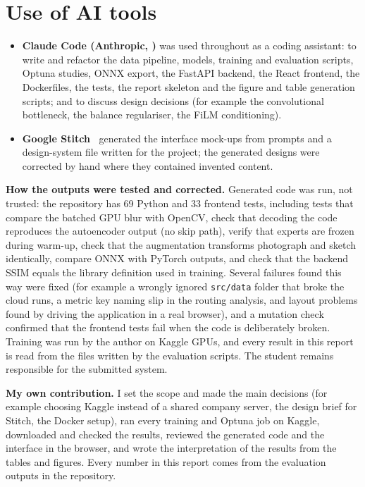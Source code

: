 \documentclass[conference]{IEEEtran}
\begin{document}
\section{Use of AI tools}
\begin{itemize}
\item \textbf{Claude Code (Anthropic, \cite{claudecode})} was used throughout as a coding assistant: to write and refactor the data pipeline, models, training and evaluation scripts, Optuna studies, ONNX export, the FastAPI backend, the React frontend, the Dockerfiles, the tests, the report skeleton and the figure and table generation scripts; and to discuss design decisions (for example the convolutional bottleneck, the balance regulariser, the FiLM conditioning).
\item \textbf{Google Stitch~\cite{stitch}} generated the interface mock-ups from prompts and a design-system file written for the project; the generated designs were corrected by hand where they contained invented content.
\end{itemize}
\textbf{How the outputs were tested and corrected.} Generated code was run, not trusted: the repository has 69 Python and 33 frontend tests, including tests that compare the batched GPU blur with OpenCV, check that decoding the code reproduces the autoencoder output (no skip path), verify that experts are frozen during warm-up, check that the augmentation transforms photograph and sketch identically, compare ONNX with PyTorch outputs, and check that the backend SSIM equals the library definition used in training.
Several failures found this way were fixed (for example a wrongly ignored \texttt{src/data} folder that broke the cloud runs, a metric key naming slip in the routing analysis, and layout problems found by driving the application in a real browser), and a mutation check confirmed that the frontend tests fail when the code is deliberately broken.
Training was run by the author on Kaggle GPUs, and every result in this report is read from the files written by the evaluation scripts. The student remains responsible for the submitted system. 

\textbf{My own contribution.} I set the scope and made the main decisions (for example choosing Kaggle instead of a shared company server, the design brief for Stitch, the Docker setup), ran every training and Optuna job on Kaggle, downloaded and checked the results, reviewed the generated code and the interface in the browser, and wrote the interpretation of the results from the tables and figures. Every number in this report comes from the evaluation outputs in the repository.
\end{document}
